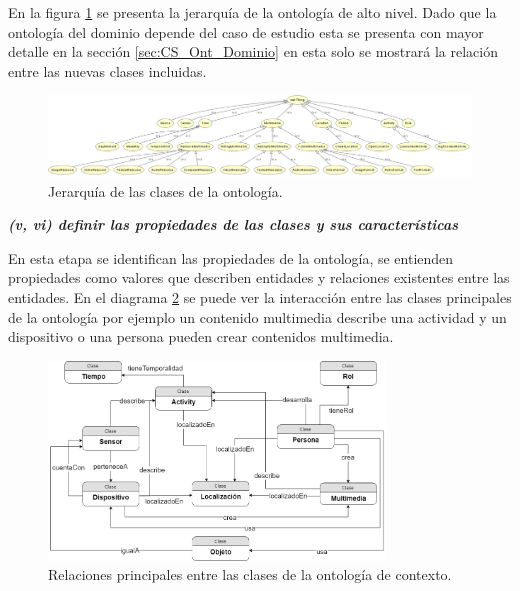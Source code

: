 En la figura \ref{fig:Contexto_Modelado_Jerarquia} se presenta la jerarquía de la ontología de alto nivel. Dado que la ontología del dominio depende del caso de estudio esta se presenta con mayor detalle en la sección \ref{sec:CS_Ont_Dominio} en esta solo se mostrará la relación entre las nuevas clases incluidas.

\begin{figure}[!hb]
\centering%
\includegraphics[width=\textwidth]{Cap3/Images/Contexto_Modelado_Jerarquia}%
\caption{Jerarquía de las clases de la ontología.} \label{fig:Contexto_Modelado_Jerarquia}
\end{figure}


\textbf{\textit{(v, vi) definir las propiedades de las clases y sus características}}

En esta etapa se identifican las propiedades de la ontología, se entienden propiedades como valores que describen entidades y relaciones existentes entre las entidades. En el diagrama \ref{fig:Contexto_Modelado_Relaciones} se puede ver la interacción entre las clases principales de la ontología por ejemplo un contenido multimedia describe una actividad y un dispositivo o una persona pueden crear contenidos multimedia.

\begin{figure}[ht]
\centering%
\includegraphics[width=0.8\textwidth]{Cap3/Images/Contexto_Modelado_Relaciones}%
\caption{Relaciones principales entre las clases de la ontología de contexto.} \label{fig:Contexto_Modelado_Relaciones}
\end{figure}

